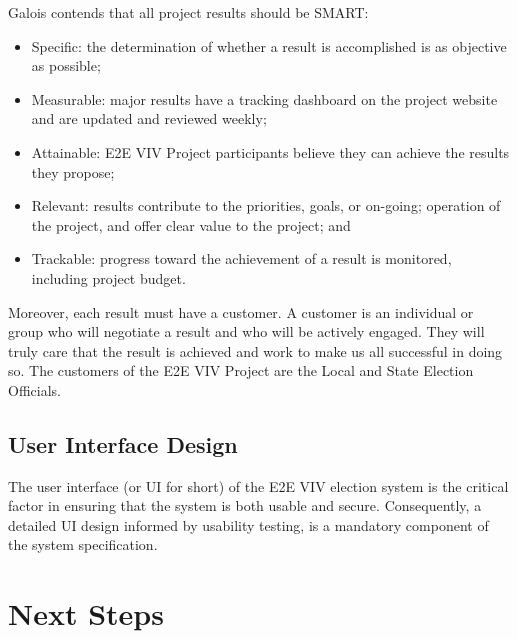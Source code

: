 Galois contends that all project results should be SMART: 
\begin{itemize}
\item Specific: the determination of whether a result is accomplished
  is as objective as possible; 
\item Measurable: major results have a tracking dashboard on the
  project website and are updated and reviewed weekly; 
\item Attainable: E2E VIV Project participants believe they can
  achieve the results they propose; 
\item Relevant: results contribute to the priorities, goals, or
  on-going; operation of the project, and offer clear value to the
  project; and 
\item Trackable: progress toward the achievement of a result is
  monitored, including project budget. 
\end{itemize}

Moreover, each result must have a customer. A customer is an
individual or group who will negotiate a result and who will be
actively engaged. They will truly care that the result is achieved and
work to make us all successful in doing so. The customers of the E2E
VIV Project are the Local and State Election Officials. 

\subsection{User Interface Design}
\label{sec:user-interf-design}

The user interface (or UI for short) of the E2E VIV election system is
the critical factor in ensuring that the system is both usable and
secure. Consequently, a detailed UI design informed by usability
testing, is a mandatory component of the system specification.


\section{Next Steps}
\label{sec:next-steps}


